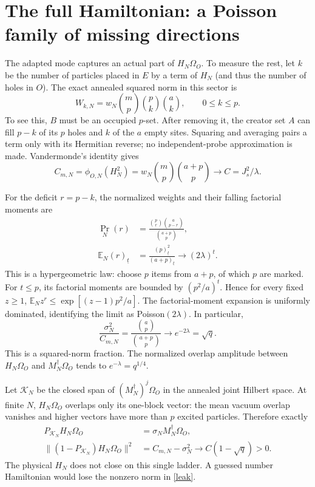 \documentclass[11pt]{article}
\newcommand{\EE}{\mathbb E}
\newcommand{\Om}{\Omega_O}
\newcommand{\KK}{\mathcal K}
\newcommand{\ff}[2]{(#1)_{\underline{#2}}}
\begin{document}
\newpage
\section{The full Hamiltonian: a Poisson family of missing directions}
The adapted mode captures an actual part of $H_N\Om$. To measure the
rest, let $k$ be the number of particles placed in $E$ by a term of
$H_N$ (and thus the number of holes in $O$). The exact annealed squared
norm in this sector is
\begin{equation}\label{weights}
 W_{k,N}=w_N\binom mp\binom pk\binom ak,
 \qquad 0\le k\le p.
\end{equation}
To see this, $B$ must be an occupied $p$-set. After removing it,
the creator set $A$ can fill $p-k$ of its $p$ holes and $k$ of the
$a$ empty sites. Squaring and averaging pairs a term only with its
Hermitian reverse; no independent-probe approximation is made.
Vandermonde's identity gives
\begin{equation}\label{cm}
 C_{m,N}=\phi_{O,N}(H_N^2)
 =w_N\binom mp\binom{a+p}p\longrightarrow C=J_s^2/\lambda.
\end{equation}

For the deficit $r=p-k$, the normalized weights and their falling
factorial moments are
\begin{align}
 \Pr_N(r)&=\frac{\binom pr\binom a{p-r}}{\binom{a+p}p},\label{deficit}\\
 \EE_N\ff rt&=\frac{\ff pt^2}{\ff{a+p}t}
       \longrightarrow(2\lambda)^t.\label{factmom}
\end{align}
This is a hypergeometric law: choose $p$ items from $a+p$, of which
$p$ are marked. For $t\le p$, its factorial moments are bounded by
$(p^2/a)^t$. Hence for every fixed $z\ge1$,
$\EE_N z^r\le\exp[(z-1)p^2/a]$.
The factorial-moment expansion is uniformly dominated, identifying
the limit as Poisson$(2\lambda)$. In particular,
\begin{equation}\label{captured}
 \frac{\sigma_N^2}{C_{m,N}}
 =\frac{\binom ap}{\binom{a+p}p}
 \longrightarrow e^{-2\lambda}=\sqrt q.
\end{equation}
This is a squared-norm fraction. The normalized overlap amplitude
between $H_N\Om$ and $M_N^\dagger\Om$ tends to
$e^{-\lambda}=q^{1/4}$.

Let $\KK_N$ be the closed span of $(M_N^\dagger)^j\Om$ in the
annealed joint Hilbert space. At finite $N$, $H_N\Om$ overlaps only
its one-block vector: the mean vacuum overlap vanishes and higher
vectors have more than $p$ excited particles. Therefore exactly
\begin{align}
 P_{\KK_N}H_N\Om&=\sigma_N M_N^\dagger\Om,\label{project}\\
 \|(1-P_{\KK_N})H_N\Om\|^2
 &=C_{m,N}-\sigma_N^2\longrightarrow C(1-\sqrt q)>0.\label{leak}
\end{align}
The physical $H_N$ does not close on this single ladder. A guessed
number Hamiltonian would lose the nonzero norm in \eqref{leak}.
\end{document}
